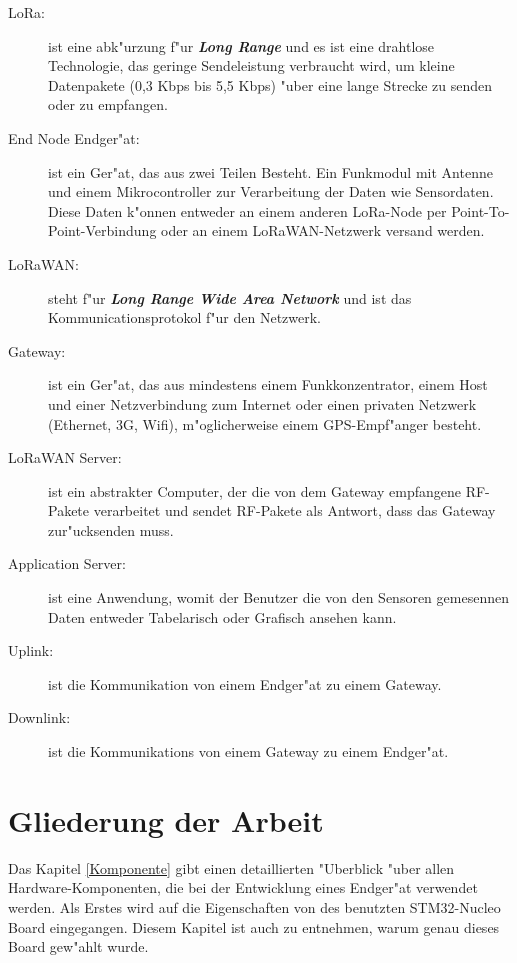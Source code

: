 \begin{description}
	\newpage
	\item[LoRa:] ist eine abk"urzung f"ur \textbf{\textit{Long Range}} 
	und es ist eine drahtlose Technologie, das geringe Sendeleistung 
	verbraucht wird, um kleine Datenpakete (0,3 Kbps bis 5,5 Kbps) "uber 
	eine lange Strecke zu senden oder zu empfangen.    
	
	\item[End Node Endger"at:] ist ein Ger"at, das aus zwei Teilen 
	Besteht. Ein Funkmodul mit Antenne und einem Mikrocontroller zur 
	Verarbeitung der Daten wie Sensordaten. Diese Daten k"onnen entweder 
	an einem anderen LoRa-Node per Point-To-Point-Verbindung oder an 
	einem LoRaWAN-Netzwerk versand werden.

	\item[LoRaWAN:] steht f"ur \textbf{\textit{Long Range Wide Area 
	Network}} und ist das Kommunicationsprotokol f"ur den Netzwerk.
	
	\item[Gateway:] ist ein Ger"at, das aus mindestens einem 
	Funkkonzentrator, einem Host und einer Netzverbindung zum Internet 
	oder einen privaten Netzwerk (Ethernet, 3G, Wifi), m"oglicherweise 
	einem GPS-Empf"anger besteht.
	
	\item[LoRaWAN Server:] ist ein abstrakter Computer, der die von dem 
	Gateway empfangene RF-Pakete verarbeitet und sendet RF-Pakete als 
	Antwort, dass das Gateway zur"ucksenden muss.
	\vspace{1cm}
	\item[Application Server:] ist eine Anwendung, womit der Benutzer 
	die von den Sensoren gemesennen Daten entweder Tabelarisch oder 
	Grafisch ansehen kann.
	
	\item[Uplink:] ist die Kommunikation von einem Endger"at zu einem 
	Gateway. 
	
	\item[Downlink:] ist die Kommunikations von einem Gateway zu einem 
	Endger"at.
\end{description}


\section{Gliederung der Arbeit}

Das Kapitel \ref{Komponente} gibt einen detaillierten "Uberblick "uber 
allen Hardware-Komponenten, die bei der Entwicklung eines Endger"at 
verwendet werden. Als Erstes wird auf die Eigenschaften von des 
benutzten STM32-Nucleo Board eingegangen. Diesem Kapitel ist auch zu 
entnehmen, warum genau dieses Board gew"ahlt wurde. 

